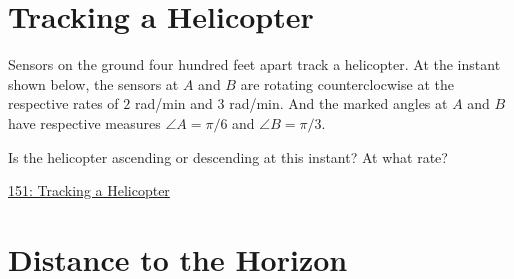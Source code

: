 \documentclass{ximera}
\begin{document}
\section{Tracking a Helicopter}
Sensors on the ground four hundred feet apart track a helicopter. At the instant shown below, the sensors at $A$ and $B$ are rotating counterclocwise at the respective rates of $2$ rad/min and $3$ rad/min. And the marked angles at $A$ and $B$ have respective measures $\angle A = \pi/6$ and $\angle B = \pi/3$.

Is the helicopter ascending or descending at this instant? At what rate?

 
\begin{onlineOnly}
   \begin{center}
\end{center}
\end{onlineOnly}

\href{https://www.desmos.com/calculator/xl8t3toppg}{151: Tracking a Helicopter}



\section{Distance to the Horizon}
\end{document}
